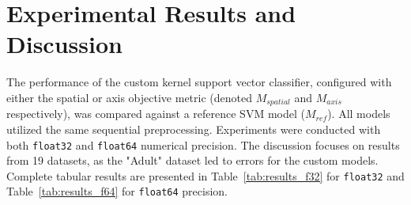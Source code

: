 \documentclass[conference]{IEEEtran}
\begin{document}
\section{Experimental Results and Discussion}
The performance of the custom kernel support vector classifier, configured with either the spatial or axis objective metric (denoted $M_{spatial}$ and $M_{axis}$ respectively), was compared against a reference SVM model ($M_{ref}$). All models utilized the same sequential preprocessing. Experiments were conducted with both \texttt{float32} and \texttt{float64} numerical precision. The discussion focuses on results from 19 datasets, as the "Adult" dataset led to errors for the custom models. Complete tabular results are presented in Table~\ref{tab:results_f32} for \texttt{float32} and Table~\ref{tab:results_f64} for \texttt{float64} precision.
\end{document}
